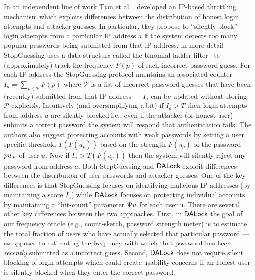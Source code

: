  In an independent line of work Tian et al.~\cite{EuroSP:THS19} developed an IP-based throttling mechanism which exploits differences between the distribution of honest login attempts and attacker guesses. In particular, they propose to ``silently block'' login attempts from a particular IP address $a$ if the system detects too many popular passwords being submitted from that IP address. In more detail StopGuessing uses a data-structure called the binomial ladder filter~\cite{SchHer:MSR18} to (approximately) track the frequency $F(p)$ of each incorrect password guess. For each IP address the StopGuessing protocol maintains an associated counter $I_a = \displaystyle{\sum_{p \in \mathcal{P}} F(p)}$ where $\mathcal{P}$ is a list of incorrect password guesses that have been (recently) submitted from that IP address --- $I_a$ can be updated without storing $\mathcal{P}$ explicitly. Intuitively (and oversimplifying a bit) if $I_a > T$ then login attempts from address $a$ are silently blocked i.e., even if the attacker (or honest user) submits a correct password the system will respond that authentication fails. The authors also suggest protecting accounts with weak passwords by setting a user specific threshold $T(F(u_p))$ based on the strength $F(u_p)$ of the password $pw_{u}$ of user $u$. Now if $I_a > T(F(u_p))$ then the system will silently reject any password from address $a$. Both StopGuessing and $\mathsf{DALock}$ exploit differences between the distribution of user passwords and attacker guesses. One of the key differences is that StopGuessing focuses on identifying malicious IP addresses (by maintaining a score $I_a$) while $\mathsf{DALock}$ focuses on protecting individual accounts by maintaining a ``hit-count'' parameter
$\Psi{u}$ for each user u. There are several other key differences between the two approaches. First, in $\mathsf{DALock}$ the goal of our frequency oracle (e.g., count-sketch, password strength meter) is to estimate the total fraction of users who have actually selected that particular password --- as opposed to estimating the frequency with which that password has been {\em recently} submitted as a incorrect guess. Second, $\mathsf{DALock}$ does not require silent blocking of login attempts which could create usability concerns if an honest user is silently blocked when they enter the correct password.  

